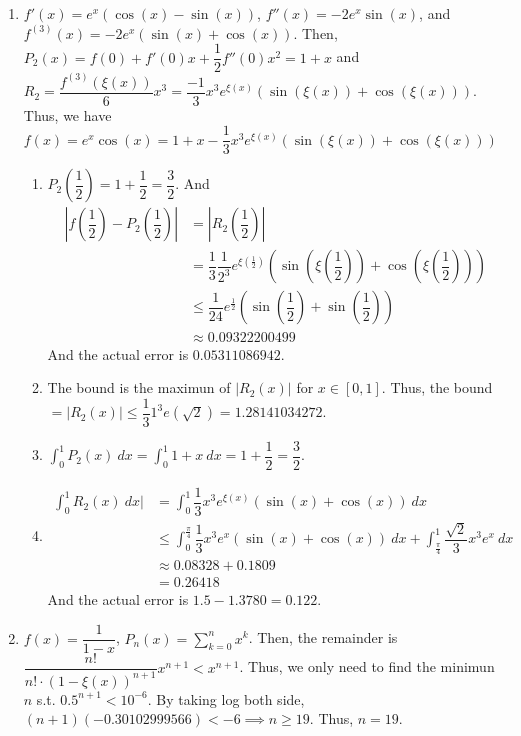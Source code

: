 \documentclass[12pt]{article}
\begin{document}
\begin{enumerate}
        \item $f'(x) = e^x(\cos(x) - \sin(x))$, $f''(x) = -2e^x\sin(x)$, and $f^{(3)}(x) = -2e^x(\sin(x) + \cos(x))$. 
        Then, $P_2(x) = f(0) + f'(0)x + \dfrac{1}{2} f''(0)x^2 = 1 + x$ and $R_2 = \dfrac{f^{(3)}(\xi(x))}{6}x^3 = \dfrac{-1}{3}x^3e^{\xi(x)}(\sin(\xi(x)) + \cos(\xi(x)))$.
        Thus, we have $f(x) = e^x\cos(x) = 1 + x - \dfrac{1}{3}x^3e^{\xi(x)}(\sin(\xi(x)) + \cos(\xi(x)))$
    \begin{enumerate}
        \item $P_2(\dfrac{1}{2}) = 1 + \dfrac{1}{2} = \dfrac{3}{2}$. And \begin{align*}
            |f(\dfrac{1}{2}) - P_2(\dfrac{1}{2})| &= |R_2(\dfrac{1}{2})|\\
            &= \dfrac{1}{3} \dfrac{1}{2^3} e^{\xi(\frac{1}{2})}(\sin(\xi(\dfrac{1}{2})) + \cos(\xi(\dfrac{1}{2})))\\
                &\leq \dfrac{1}{24} e^{\frac{1}{2}}(\sin(\dfrac{1}{2}) + \sin(\dfrac{1}{2}))\\
                &\approx  0.09322200499
        \end{align*}
        And the actual error is $0.05311086942$.

        \item The bound is the maximun of $|R_2(x)|$ for $x \in [0, 1]$.
        Thus, the bound$ = |R_2(x)| \leq \dfrac{1}{3} 1^3 e(\sqrt{2}) = 1.28141034272$.

        \item $\displaystyle\int_{0}^{1} P_2(x)\ dx = \displaystyle\int_{0}^{1} 1 + x\ dx = 1 + \dfrac{1}{2} = \dfrac{3}{2}$.
        
        \item \begin{align*}
            \int_{0}^{1} R_2(x)\ dx| &=\int_{0}^{1} \dfrac{1}{3}x^3 e^{\xi(x)}(\sin(x) + \cos(x))\ dx\\
            &\leq \int_{0}^{\frac{\pi}{4}} \dfrac{1}{3}x^3 e^x (\sin(x) + \cos(x))\ dx+ \int_{\frac{\pi}{4}}^{1} \dfrac{\sqrt{2}}{3}x^3e^x\ dx\\
            &\approx 0.08328 + 0.1809\\
            &= 0.26418
        \end{align*}
        And the actual error is $1.5 - 1.3780 = 0.122$.
    \end{enumerate}

    \item $f(x) = \dfrac{1}{1-x}$, $P_n(x) = \displaystyle\sum_{k=0}^{n} x^k$.
    Then, the remainder is $\dfrac{n!}{n! \cdot (1-\xi(x))^{n+1}}x^{n+1} < x^{n+1}$.
    Thus, we only need to find the minimun $n$ s.t. $0.5^{n+1} < 10^{-6}$.
    By taking log both side, $(n+1)(-0.30102999566) < -6\implies n \geq 19$.
    Thus, $n = 19$.


\end{enumerate}
\end{document}
